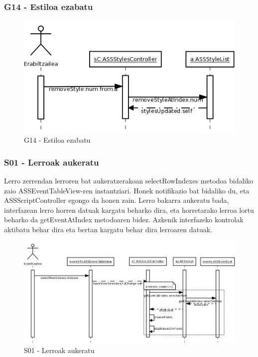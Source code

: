 \subsubsection{G14 - Estiloa ezabatu}
\begin{figure}[htp]
\begin{center}
\includegraphics[scale=0.35]{Pictures/Chapter4/Diseinua/G14.png}
\caption{G14 - Estiloa ezabatu}
\label{g14d}
\end{center}
\end{figure}

\newpage
\subsubsection{S01 - Lerroak aukeratu}
Lerro zerrendan lerroren bat aukeratzerakoan selectRowIndexes metodoa bidaliko zaio ASSEventTableView-ren instantziari. Honek notifikazio bat bidaliko du, eta ASSScriptController egongo da honen zain. Lerro bakarra aukeratu bada, interfazean lerro horren datuak kargatu beharko dira, eta horretarako lerroa lortu beharko da getEventAtIndex metodoaren bidez. Azkenik interfazeko kontrolak aktibatu behar dira eta bertan kargatu behar dira lerroaren datuak.
\begin{figure}[htp]
\begin{center}
\includegraphics[scale=0.3]{Pictures/Chapter4/Diseinua/S01.png}
\caption{S01 - Lerroak aukeratu}
\label{s01d}
\end{center}
\end{figure}

